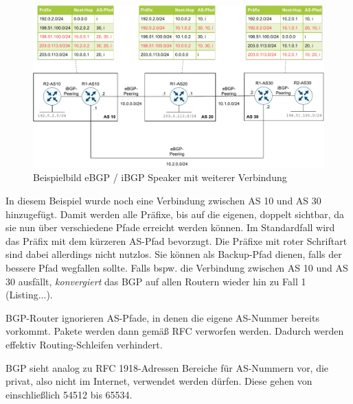 \begin{figure}[h]
  \centering
  \includegraphics[scale=0.8]{Figures/ebgp_peerings_additional_connection.pdf}
  \caption{Beispielbild eBGP / iBGP Speaker mit weiterer Verbindung}
  \label{grafik: ebgp_peerings_additional_connection}
\end{figure}\FloatBarrier

In diesem Beispiel wurde noch eine Verbindung zwischen AS 10 und AS 30 hinzugefügt. Damit werden alle Präfixe, bis auf die eigenen, doppelt sichtbar, da sie nun über verschiedene Pfade erreicht werden können. Im Standardfall wird das Präfix mit dem kürzeren AS-Pfad bevorzugt. Die Präfixe mit roter Schriftart sind dabei allerdings nicht nutzlos. Sie können als Backup-Pfad dienen, falls der bessere Pfad wegfallen sollte. Falls bspw. die Verbindung zwischen AS 10 und AS 30 ausfällt, \textit{konvergiert} das BGP auf allen Routern wieder hin zu Fall 1 (Listing...).

BGP-Router ignorieren AS-Pfade, in denen die eigene AS-Nummer bereits vorkommt. Pakete werden dann gemäß RFC verworfen werden. Dadurch werden effektiv Routing-Schleifen verhindert.

BGP sieht analog zu RFC 1918-Adressen Bereiche für AS-Nummern vor, die privat, also nicht im Internet, verwendet werden dürfen. Diese gehen von einschließlich 54512 bis 65534.





